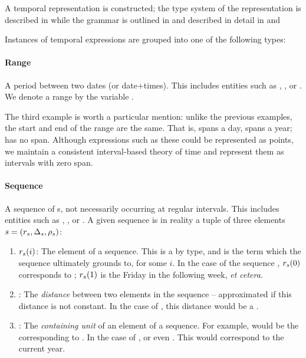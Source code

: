 A temporal representation is constructed; the type system of the representation
	is described in  while the grammar is outlined in
	 and described in detail in 
	and 

Instances of temporal expressions are grouped into one of the following types:
\paragraph{Range}
A period between two dates (or date$+$times).
This includes entities such as , , or
	.
We denote a range by the variable \range.

The third example is worth a particular mention:
	unlike the previous examples, the start and end of the range are the same.
That is,  spans a day,  spans a year;  has no span.
Although expressions such as these could be represented as points,
	we maintain a consistent interval-based theory of time
	\cite{key:1981allen-temporal} and represent them as intervals with
	zero span.

\paragraph{Sequence}
A sequence of s, not necessarily occurring at regular intervals.
This includes entities such as , , or
	.
A given sequence is in reality a tuple of three elements
	$s=(r_s,\Delta_s,\rho_s)$:
\begin{enumerate}
	\item $r_s(i)$: 
		The  element of a sequence.
		This is a  by type, and is the term which the sequence ultimately
			grounds to, for some $i$.
		In the case of the sequence , $r_s(0)$ corresponds to
			; 
			$r_s(1)$ is the Friday in the following week, \textit{et cetera}.
	\item \seqjump:
		The \textit{distance} between two elements in the sequence -- approximated
			if this distance is not constant.
		In the case of , this distance would be a .
	\item \seqcanon:
		The \textit{containing unit} of an element of a sequence.
		For example,  would be the 
			corresponding to .
		In the case of , or even . This 
			would correspond to the current year.
\end{enumerate}

